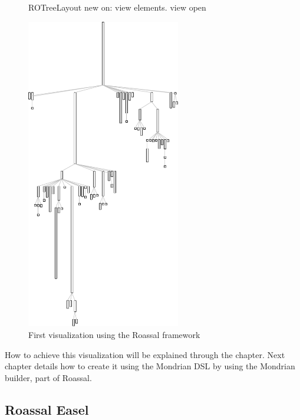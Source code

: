 \documentclass[a4paper,10pt,twoside]{book}
\begin{document}
\begin{figure}[H]
\begin{minipage}[t]{0.5\textwidth}
\begin{code}{}
ROTreeLayout new on: view elements.
view open
\end{code}
   \end{minipage}
   \hfill
   \begin{minipage}[t]{0.6\textwidth}
      \vspace{0pt} \raggedright
       \centering
		\includegraphics[width=0.6\textwidth]{collectionHierarchy}
   \end{minipage}
\label{fig:firstVisualization}
\caption{First visualization using the Roassal framework}
\end{figure}

How to achieve this visualization will be explained through the chapter. 
Next chapter details how to create it using the Mondrian DSL by using the Mondrian builder, part of Roassal.

\subsection{Roassal Easel}
\end{document}
